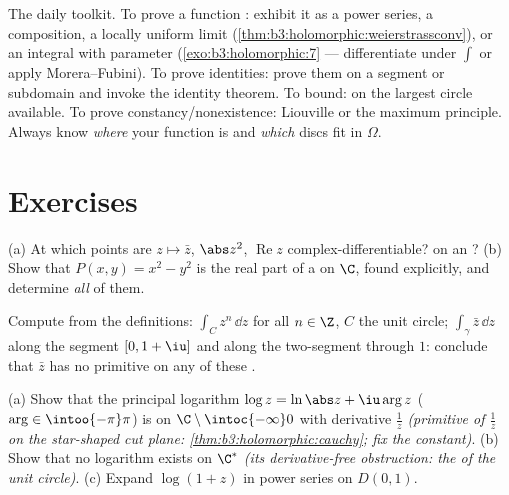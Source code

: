 \begin{method}\label{met:b3:holomorphic:toolkit}
The daily toolkit. To prove a function : exhibit it
as a power series, a composition, a locally uniform limit
(\cref{thm:b3:holomorphic:weierstrassconv}), or an integral
with  parameter (\cref{exo:b3:holomorphic:7} ---
differentiate under $\int$ or apply Morera--Fubini). To prove
identities: prove them on a segment or subdomain and invoke
the identity theorem. To bound:  on the
largest circle available. To prove constancy/nonexistence:
Liouville or the maximum principle. Always know \emph{where}
your function is  and \emph{which} discs fit in
$\Omega$.
\end{method}

\section{Exercises}

\begin{exercise}[$\star$]\label{exo:b3:holomorphic:1}
(a) At which points are $z \mapsto \bar z$, $\abs z^2$,
$\operatorname{Re}z$ complex-differentiable?  on an
?
(b) Show that $P(x, y) = x^2 - y^2$ is the real part of a
 on $\C$, found explicitly, and determine
\emph{all} of them.
\end{exercise}

\begin{exercise}[$\star$]\label{exo:b3:holomorphic:2}
Compute from the definitions: $\int_{C}z^n\,\dd z$ for all $n
\in \Z$, $C$ the unit circle; $\int_\gamma\bar z\,\dd z$ along
the segment $[0, 1+\iu]$ and along the two-segment 
through $1$: conclude that $\bar z$ has no primitive on any
 of these .
\end{exercise}

\begin{exercise}[$\star\star$]\label{exo:b3:holomorphic:3}
(a) Show that the principal logarithm $\log z = \ln\abs z +
\iu\arg z$ ($\arg \in \intoo{-\pi}\pi$) is  on
$\C\setminus\intoc{-\infty}0$ with derivative $\frac1z$
\emph{(primitive of $\frac1z$ on the star-shaped cut plane:
\cref{thm:b3:holomorphic:cauchy}; fix the constant)}.
(b) Show that no  logarithm exists on
$\C^*$ \emph{(its derivative-free obstruction: the  of
the unit circle)}.
(c) Expand $\log(1 + z)$ in power series on $D(0,1)$.
\end{exercise}

